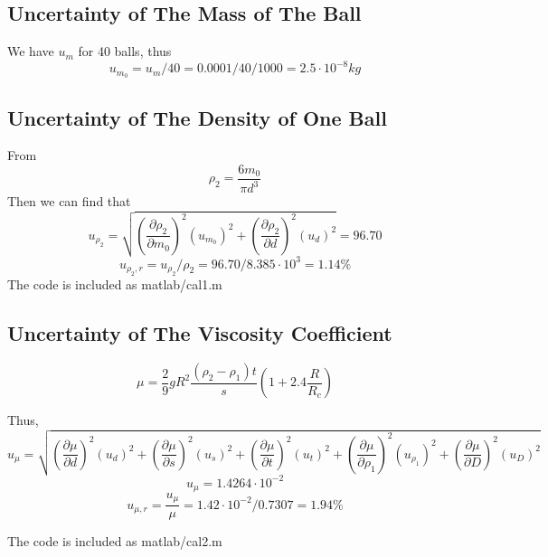 \subsection{Uncertainty of The Mass of The Ball}
We have $u_m $ for 40 balls, thus
$$   u_{m_0} = u_m /40 = 0.0001 / 40 / 1000 = 2.5 \cdot 10^{-8} kg  $$

\subsection{Uncertainty of The Density of One Ball}
From
$$   \rho_2 = \frac{6m_0}{ \pi d^3 } $$
Then we can find that
$$ u_{\rho_2} = \sqrt{(\frac{\partial \rho_2}{\partial m_0})^2(u_{m_0})^2 +
  (\frac{\partial \rho_2}{\partial d})^2(u_d)^2 
} = 96.70  $$ 
$$   u_{\rho_2,r} = u_{\rho_2 } / \rho_2  =  96.70 / 8.385 \cdot 10^3 =   1.14 \% $$ 
The code is included as matlab/cal1.m 


\subsection{Uncertainty of The Viscosity Coefficient}


$$ \mu = \frac{2}{9} g R^2 \frac{( \rho_2 - \rho_1 ) t  }{s} (1 + 2.4
\frac{R}{R_c})  $$

Thus,
$$ u_{\mu} = \sqrt{(\frac{\partial \mu}{\partial d})^2(u_d)^2
  + (\frac{\partial \mu}{\partial s})^2(u_s)^2
  + (\frac{\partial \mu}{\partial t})^2(u_t)^2
  + (\frac{\partial \mu}{\partial \rho_1})^2(u_{\rho_1})^2
  + (\frac{\partial \mu}{\partial D})^2(u_D)^2 }  $$ 
$$ u_{\mu}  =  1.4264 \cdot 10^{-2}   $$
$$ u_{\mu,r} =\frac{u_\mu}{\mu}=  1.42 \cdot 10^{-2}  / 0.7307 =   1.94 \% $$

The code is included as matlab/cal2.m 

